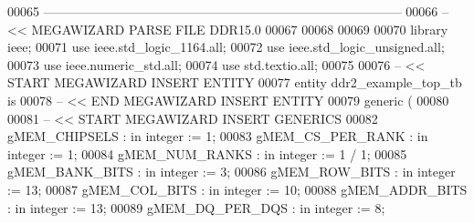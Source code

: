 \begin{DoxyCode}
00065 \textcolor{keyword}{------------------------------------------------------------------------------------}
00066 \textcolor{keyword}{-- << MEGAWIZARD PARSE FILE DDR15.0}
00067 
00068 
00069 
00070 \textcolor{vhdlkeyword}{library }\textcolor{keywordflow}{ieee};
00071 \textcolor{vhdlkeyword}{use }ieee.std\_logic\_1164.\textcolor{keywordflow}{all};
00072 \textcolor{vhdlkeyword}{use }ieee.std\_logic\_unsigned.\textcolor{keywordflow}{all};
00073 \textcolor{vhdlkeyword}{use }ieee.numeric\_std.\textcolor{keywordflow}{all};
00074 \textcolor{vhdlkeyword}{use }std.textio.\textcolor{keywordflow}{all};
00075 
00076 \textcolor{keyword}{-- << START MEGAWIZARD INSERT ENTITY}
00077 \textcolor{keywordflow}{entity }ddr2_example_top_tb \textcolor{keywordflow}{is}
00078 \textcolor{keyword}{-- << END MEGAWIZARD INSERT ENTITY}
00079     \textcolor{keywordflow}{generic} \textcolor{vhdlchar}{(}
00080 
00081 \textcolor{keyword}{-- << START MEGAWIZARD INSERT GENERICS}
00082         \textcolor{vhdlchar}{gMEM_CHIPSELS}          \textcolor{vhdlchar}{:} \textcolor{keywordflow}{in} \textcolor{comment}{integer} \textcolor{vhdlchar}{:=} \textcolor{vhdllogic}{}\textcolor{vhdllogic}{1};
00083         \textcolor{vhdlchar}{gMEM_CS_PER_RANK}       \textcolor{vhdlchar}{:} \textcolor{keywordflow}{in} \textcolor{comment}{integer} \textcolor{vhdlchar}{:=} \textcolor{vhdllogic}{}\textcolor{vhdllogic}{1};
00084         \textcolor{vhdlchar}{gMEM_NUM_RANKS}         \textcolor{vhdlchar}{:} \textcolor{keywordflow}{in} \textcolor{comment}{integer} \textcolor{vhdlchar}{:=} \textcolor{vhdllogic}{}\textcolor{vhdllogic}{1} \textcolor{vhdlchar}{/} \textcolor{vhdllogic}{}\textcolor{vhdllogic}{1};
00085         \textcolor{vhdlchar}{gMEM_BANK_BITS}         \textcolor{vhdlchar}{:} \textcolor{keywordflow}{in} \textcolor{comment}{integer} \textcolor{vhdlchar}{:=} \textcolor{vhdllogic}{}\textcolor{vhdllogic}{3};
00086         \textcolor{vhdlchar}{gMEM_ROW_BITS}          \textcolor{vhdlchar}{:} \textcolor{keywordflow}{in} \textcolor{comment}{integer} \textcolor{vhdlchar}{:=} \textcolor{vhdllogic}{}\textcolor{vhdllogic}{13};
00087         \textcolor{vhdlchar}{gMEM_COL_BITS}          \textcolor{vhdlchar}{:} \textcolor{keywordflow}{in} \textcolor{comment}{integer} \textcolor{vhdlchar}{:=} \textcolor{vhdllogic}{}\textcolor{vhdllogic}{10};
00088         \textcolor{vhdlchar}{gMEM_ADDR_BITS}         \textcolor{vhdlchar}{:} \textcolor{keywordflow}{in} \textcolor{comment}{integer} \textcolor{vhdlchar}{:=} \textcolor{vhdllogic}{}\textcolor{vhdllogic}{13};
00089         \textcolor{vhdlchar}{gMEM_DQ_PER_DQS}        \textcolor{vhdlchar}{:} \textcolor{keywordflow}{in} \textcolor{comment}{integer} \textcolor{vhdlchar}{:=} \textcolor{vhdllogic}{}\textcolor{vhdllogic}{8};

\end{DoxyCode}
